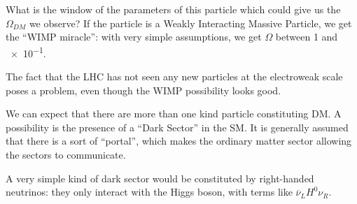 \documentclass[main.tex]{subfiles}
\begin{document}
What is the window of the parameters of this particle which could give us the \(\Omega_{DM}\) we observe?
If the particle is a Weakly Interacting Massive Particle, we get the ``WIMP miracle'': with very simple assumptions, we get \(\Omega \) between 1 and \num{e-1}. 

The fact that the LHC has not seen any new particles at the electroweak scale poses a problem, even though the WIMP possibility looks good. 

We can expect that there are more than one kind particle constituting DM.
A possibility is the presence of a ``Dark Sector'' in the SM. 
It is generally assumed that there is a sort of ``portal'', which makes the ordinary matter sector allowing the sectors to communicate.

A very simple kind of dark sector would be constituted by right-handed neutrinos: they only interact with the Higgs boson, with terms like \(\overline{\nu}_{L} H^{0} \nu_{R}\).
\end{document}

